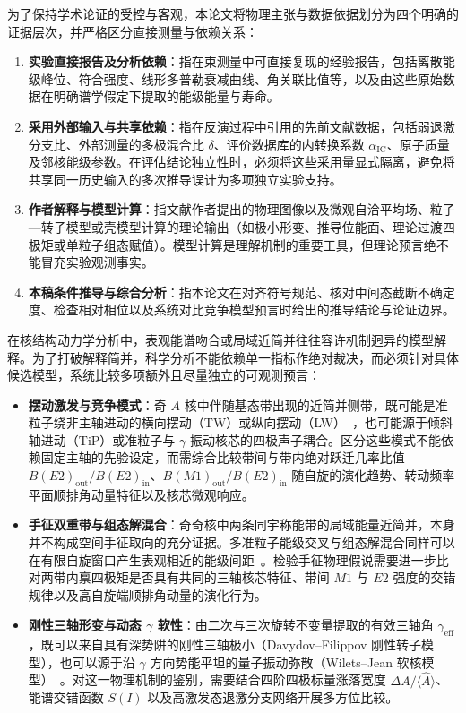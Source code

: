 为了保持学术论证的受控与客观，本论文将物理主张与数据依据划分为四个明确的证据层次，并严格区分直接测量与依赖关系：
\begin{enumerate}
    \item \textbf{实验直接报告及分析依赖}：指在束测量中可直接复现的经验报告，包括离散能级峰位、符合强度、线形多普勒衰减曲线、角关联比值等，以及由这些原始数据在明确谱学假定下提取的能级能量与寿命。
    \item \textbf{采用外部输入与共享依赖}：指在反演过程中引用的先前文献数据，包括弱退激分支比、外部测量的多极混合比 $\delta$、评价数据库的内转换系数 $\alpha_{\text{IC}}$、原子质量及邻核能级参数。在评估结论独立性时，必须将这些采用量显式隔离，避免将共享同一历史输入的多次推导误计为多项独立实验支持。
    \item \textbf{作者解释与模型计算}：指文献作者提出的物理图像以及微观自洽平均场、粒子---转子模型或壳模型计算的理论输出（如极小形变、推导位能面、理论过渡四极矩或单粒子组态赋值）。模型计算是理解机制的重要工具，但理论预言绝不能冒充实验观测事实。
    \item \textbf{本稿条件推导与综合分析}：指本论文在对齐符号规范、核对中间态截断不确定度、检查相对相位以及系统对比竞争模型预言时给出的推导结论与论证边界。
\end{enumerate}

在核结构动力学分析中，表观能谱吻合或局域近简并往往容许机制迥异的模型解释。为了打破解释简并，科学分析不能依赖单一指标作绝对裁决，而必须针对具体候选模型，系统比较多项额外且尽量独立的可观测预言：
\begin{itemize}
    \item \textbf{摆动激发与竞争模式}：奇 $A$ 核中伴随基态带出现的近简并侧带，既可能是准粒子绕非主轴进动的横向摆动（TW）或纵向摆动（LW）~\cite{campaign-g07-gorgen-2004-163lu-quadrupole-moments}，也可能源于倾斜轴进动（TiP）或准粒子与 $\gamma$ 振动核芯的四极声子耦合。区分这些模式不能依赖固定主轴的先验设定，而需综合比较带间与带内绝对跃迁几率比值 $B(E2)_{\text{out}}/B(E2)_{\text{in}}$、$B(M1)_{\text{out}}/B(E2)_{\text{in}}$ 随自旋的演化趋势、转动频率平面顺排角动量特征以及核芯微观响应。
    \item \textbf{手征双重带与组态解混合}：奇奇核中两条同宇称能带的局域能量近简并，本身并不构成空间手征取向的充分证据。多准粒子能级交叉与组态解混合同样可以在有限自旋窗口产生表观相近的能级间距~\cite{petrache-2006-near-degenerate-chiral-misinterpretation}。检验手征物理假说需要进一步比对两带内禀四极矩是否具有共同的三轴核芯特征、带间 $M1$ 与 $E2$ 强度的交错规律以及高自旋端顺排角动量的演化行为。
    \item \textbf{刚性三轴形变与动态 $\gamma$ 软性}：由二次与三次旋转不变量提取的有效三轴角 $\gamma_{\text{eff}}$，既可以来自具有深势阱的刚性三轴极小（Davydov--Filippov 刚性转子模型），也可以源于沿 $\gamma$ 方向势能平坦的量子振动弥散（Wilets--Jean 软核模型）~\cite{poves-2020-limits-assigning-nuclear-shape}。对这一物理机制的鉴别，需要结合四阶四极标量涨落宽度 $\Delta A/\langle \hat{A} \rangle$、能谱交错函数 $S(I)$ 以及高激发态退激分支网络开展多方位比较。
\end{itemize}

